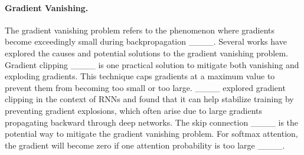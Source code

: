 

\paragraph{Gradient Vanishing.} The gradient vanishing problem refers to the phenomenon where gradients become exceedingly small during backpropagation ____.
Several works have explored the causes and potential solutions to the gradient vanishing problem. Gradient clipping ____ is one practical solution to mitigate both vanishing and exploding gradients. This technique caps gradients at a maximum value to prevent them from becoming too small or too large. ____ explored gradient clipping in the context of RNNs and found that it can help stabilize training by preventing gradient explosions, which often arise due to large gradients propagating backward through deep networks. The skip connection ____ is the potential way to mitigate the gradient vanishing problem. For softmax attention, the gradient will become zero if one attention probability is too large ____.

